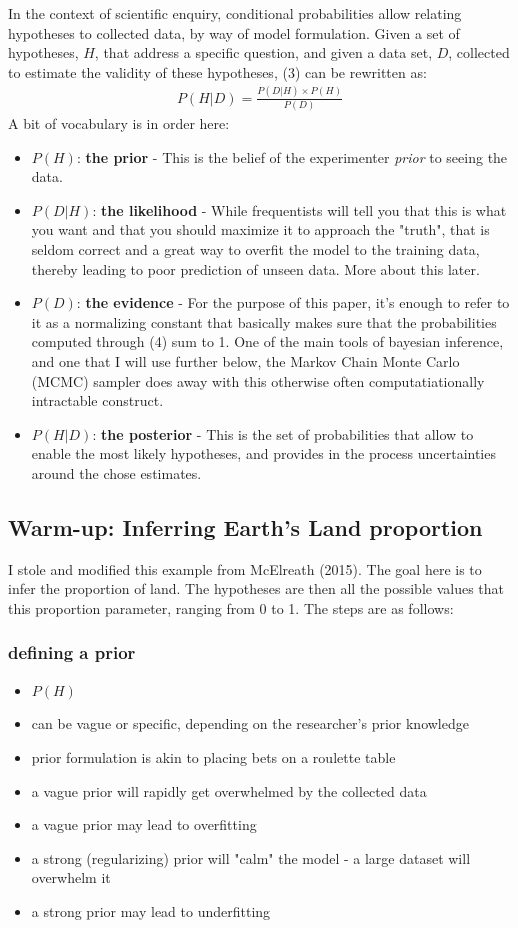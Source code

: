 \documentclass[10pt]{article}
\begin{document}
	In the context of scientific enquiry, conditional probabilities allow relating hypotheses to collected data, by way of model formulation. Given a set of hypotheses, $H$, that address a specific question, and given a data set, $D$, collected to estimate the validity of these hypotheses, (3) can be rewritten as:
	\begin{align}
		P(H|D) = \frac{P(D|H) \times P(H)}{P(D)}
	\end{align}
	A bit of vocabulary is in order here:
	\begin{itemize}
		\item $P(H)$: \textbf{the prior} - This is the belief of the experimenter \textit{prior} to seeing the data. 
		\item $P(D|H)$: \textbf{the likelihood} - While frequentists will tell you that this is what you want and that you should maximize it to approach the "truth", that is seldom correct and a great way to overfit the model to the training data, thereby leading to poor prediction of unseen data. More about this later.
		\item $P(D)$: \textbf{the evidence} - For the purpose of this paper, it's enough to refer to it as a normalizing constant that basically makes sure that the probabilities computed through (4) sum to 1. One of the main tools of bayesian inference, and one that I will use further below, the Markov Chain Monte Carlo (MCMC) sampler does away with this otherwise often computatiationally intractable construct.
		\item $P(H|D)$: \textbf{the posterior} - This is the set of probabilities that allow to enable the most likely hypotheses, and provides in the process uncertainties around the chose estimates.
	\end{itemize}
	\subsection{Warm-up: Inferring Earth's Land proportion}
		I stole and modified this example from McElreath (2015). The goal here is to infer the proportion of land. The hypotheses are then all the possible values that this proportion parameter, ranging from 0 to 1. The steps are as follows:
		\subsubsection{defining a prior}
			\begin{itemize}
				\item $P(H)$
				\item can be vague or specific, depending on the researcher's prior knowledge
				\item prior formulation is akin to placing bets on a roulette table
				\item a vague prior will rapidly get overwhelmed by the collected data
				\item a vague prior may lead to overfitting
				\item a strong (regularizing) prior will "calm" the model - a large dataset will overwhelm it				
				\item a strong prior may lead to underfitting
			\end{itemize}
		\FloatBarrier
\end{document}
